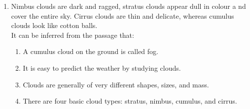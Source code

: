 \documentclass[journal,9pt,onecolumn]{IEEEtran}
\begin{document}
\begin{enumerate}
   The most accurate and the most consistent players during the tournament are respectively:
   \begin{multicols}{4}
   \begin{enumerate}
       \item P and S
       \item Q and R
       \item Q and Q
       \item R and Q
   \end{enumerate}
   \end{multicols}


\item Nimbus clouds are dark and ragged, stratus clouds appear dull in colour a nd cover the entire
sky. Cirrus clouds are thin and delicate, whereas cumulus clouds look like cotton balls.\\
	It can be inferred from the passage that:
\begin{enumerate}
    \item A cumulus cloud on the ground is called fog.
    \item It is easy to predict the weather by studying clouds.
    \item Clouds are generally of very different shapes, sizes, and mass.
    \item There are four basic cloud types: stratus, nimbus, cumulus, and cirrus.
\end{enumerate}
\end{enumerate}
\end{document}
